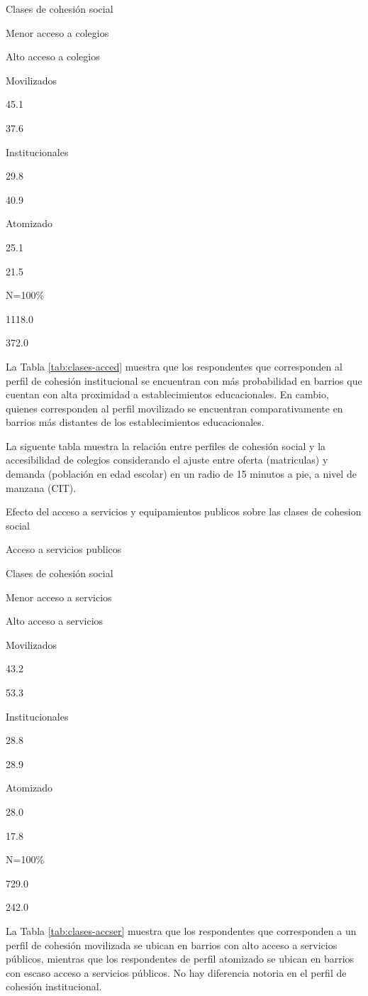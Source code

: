 \documentclass[
  12pt,
]{book}
\begin{document}
Clases de cohesión social

Menor acceso a colegios

Alto acceso a colegios

Movilizados

45.1

37.6

Institucionales

29.8

40.9

Atomizado

25.1

21.5

N=100\%

1118.0

372.0

La Tabla \ref{tab:clases-acced} muestra que los respondentes que corresponden al perfil de cohesión institucional se encuentran con más probabilidad en barrios que cuentan con alta proximidad a establecimientos educacionales. En cambio, quienes corresponden al perfil movilizado se encuentran comparativamente en barrios más distantes de los establecimientos educacionales.

La siguente tabla muestra la relación entre perfiles de cohesión social y la accesibilidad de colegios considerando el ajuste entre oferta (matriculas) y demanda (población en edad escolar) en un radio de 15 minutos a pie, a nivel de manzana (CIT).

\label{tab:clases-accser}Efecto del acceso a servicios y equipamientos publicos sobre las clases de cohesion social

Acceso a servicios publicos

Clases de cohesión social

Menor acceso a servicios

Alto acceso a servicios

Movilizados

43.2

53.3

Institucionales

28.8

28.9

Atomizado

28.0

17.8

N=100\%

729.0

242.0

La Tabla \ref{tab:clases-accser} muestra que los respondentes que corresponden a un perfil de cohesión movilizada se ubican en barrios con alto acceso a servicios públicos, mientras que los respondentes de perfil atomizado se ubican en barrios con escaso acceso a servicios públicos. No hay diferencia notoria en el perfil de cohesión institucional.
\end{document}
